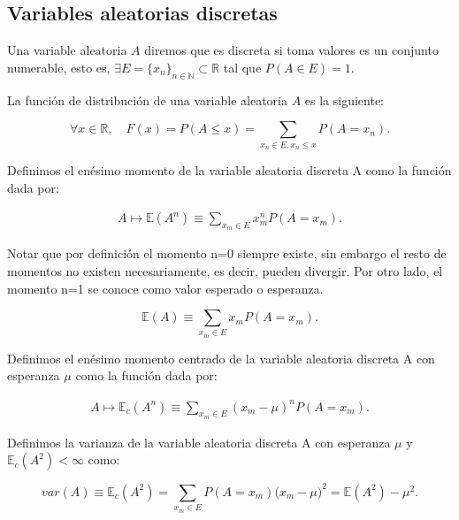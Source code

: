 \documentclass[../proyecto.tex]{memoir}
\begin{document}


\subsection{Variables aleatorias discretas}

\begin{defi}
Una variable aleatoria $A$ diremos que es discreta si toma valores es un conjunto numerable, esto es, $\exists E=\{x_n\}_{n \in \mathds{N}} \subset \mathds{R}$ tal que $P(A \in E)=1$. 
\end{defi}


\begin{defi}
La función de distribución de una variable aleatoria $A$ es la siguiente: 

$$
\forall x\in \mathds{R}, \quad F(x) = P( A \leq x) = \sum_{x_n\in E, x_n \leq x} P(A=x_n).
$$
\end{defi}

\begin{defi}
Definimos el enésimo momento de la variable aleatoria discreta A como la función dada por:

\begin{align*}
A \mapsto \mathds{E}(A^n) \equiv \sum_{x_m \in E} x_m^n P(A=x_m).
\end{align*}
\end{defi}

Notar que por definición el momento n=0 siempre existe, sin embargo el resto de momentos no existen necesariamente, es decir, pueden divergir. Por otro lado, el momento n=1 se conoce como valor esperado o esperanza.

$$
\mathds{E}(A) \equiv \sum_{x_m \in E} x_m P(A=x_m).
$$

\begin{defi}
Definimos el enésimo momento centrado de la variable aleatoria discreta A con esperanza $\mu$ como la función dada por:

\begin{align*}
A \mapsto \mathds{E}_c(A^n) \equiv \sum_{x_m \in E} (x_m - \mu)^n P(A=x_m).
\end{align*}
\end{defi}


\begin{defi}
Definimos la varianza de la variable aleatoria discreta A con esperanza $\mu$ y $\mathds{E}_c(A^2) < \infty $ como:

$$
var(A) \equiv \mathds{E}_c(A^2) = \sum_{x_m\in E} P(A=x_m) \big(x_m - \mu\big)^2 = \mathds{E}(A^2) - \mu^2.
$$
\end{defi}
\end{document}
